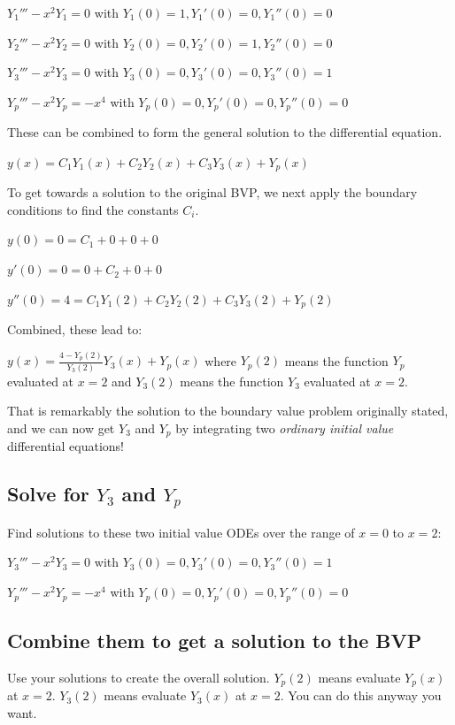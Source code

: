 \documentclass[11pt]{article}
\begin{document}
\(Y_1''' - x^2 Y_1 = 0\) with \(Y_1(0)=1, Y_1'(0)=0, Y_1''(0)=0\)

\(Y_2''' - x^2 Y_2 = 0\) with \(Y_2(0)=0, Y_2'(0)=1, Y_2''(0)=0\)

\(Y_3''' - x^2 Y_3 = 0\) with \(Y_3(0)=0, Y_3'(0)=0, Y_3''(0)=1\)

\(Y_p''' - x^2 Y_p = -x^4\) with \(Y_p(0)=0, Y_p'(0)=0, Y_p''(0)=0\)

These can be combined to form the general solution to the differential equation.

\(y(x) = C_1 Y_1(x) + C_2 Y_2(x) + C_3 Y_3(x) + Y_p(x)\)

To get towards a solution to the original BVP, we next apply the boundary conditions to find the constants \(C_i\).

\(y(0) = 0 = C_1 + 0 + 0 + 0\)

\(y'(0) = 0 = 0 + C_2 + 0 + 0\)

\(y''(0) = 4 = C_1 Y_1(2) + C_2 Y_2(2) + C_3 Y_3(2) + Y_p(2)\)

Combined, these lead to:

\(y(x) = \frac{4 - Y_p(2)}{Y_3(2)} Y_3(x) + Y_p(x)\) where \(Y_p(2)\) means the function \(Y_p\) evaluated at \(x=2\) and \(Y_3(2)\) means the function \(Y_3\) evaluated at \(x=2\).

That is remarkably the solution to the boundary value problem originally stated, and we can now get \(Y_3\) and \(Y_p\) by integrating two \emph{ordinary initial value} differential equations!

\subsection{Solve for \(Y_3\) and \(Y_p\)}
\label{sec:org93ddeaa}

Find solutions to these two initial value ODEs over the range of \(x=0\) to \(x=2\):

\(Y_3''' - x^2 Y_3 = 0\) with \(Y_3(0)=0, Y_3'(0)=0, Y_3''(0)=1\)

\(Y_p''' - x^2 Y_p = -x^4\) with \(Y_p(0)=0, Y_p'(0)=0, Y_p''(0)=0\)

\subsection{Combine them to get a solution to the BVP}
\label{sec:orgc7d0cf0}

Use your solutions to create the overall solution. \(Y_p(2)\) means evaluate \(Y_p(x)\) at \(x=2\). \(Y_3(2)\) means evaluate \(Y_3(x)\) at \(x=2\). You can do this anyway you want.
\end{document}

